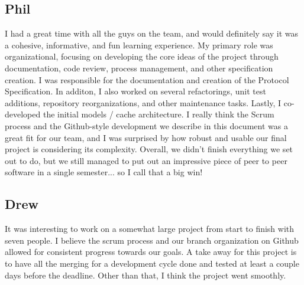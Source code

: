 \documentclass[letterpaper,10pt,oneside]{sphinxmanual}
\begin{document}
\subsection{Phil}
\label{future:phil}
I had a great time with all the guys on the team, and would definitely say it was a cohesive, informative,
and fun learning experience.  My primary role was organizational, focusing on developing the core ideas of
the project through documentation, code review, process management, and other specification creation.  I
was responsible for the documentation and creation of the Protocol Specification.  In additon, I also worked
on several refactorings, unit test additions, repository reorganizations, and other maintenance tasks.  Lastly,
I co-developed the initial models / cache architecture.  I really think the Scrum process and the Github-style
development we describe in this document was a great fit for our team, and I was surprised by how robust and
usable our final project is considering its complexity.  Overall, we didn't finish everything we set out to do,
but we still managed to put out an impressive piece of peer to peer software in a single semester... so I call
that a big win!


\subsection{Drew}
\label{future:drew}
It was interesting to work on a somewhat large project from start to finish with seven people.  I believe the
scrum process and our branch organization on Github allowed for consistent progress towards our goals.  A take
away for this project is to have all the merging for a development cycle done and tested at least a couple
days before the deadline.  Other than that, I think the project went smoothly.



\renewcommand{\indexname}{Index}
\printindex
\end{document}
